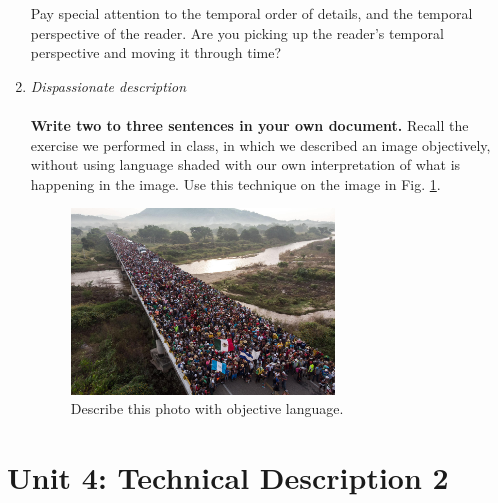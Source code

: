 \documentclass{article}
\begin{document}
\begin{enumerate}
\begin{itemize}
\end{itemize}
Pay special attention to the temporal order of details, and the temporal perspective of the reader.  Are you picking up the reader's temporal perspective and moving it through time?
\item \textit{Dispassionate description} \\ \\
\textbf{Write two to three sentences in your own document.}  Recall the exercise we performed in class, in which we described an image objectively, without using language shaded with our own interpretation of what is happening in the image.  Use this technique on the image in Fig. \ref{fig:caravan}.

\begin{figure}
\centering
\includegraphics[width=7cm]{figures/caravan.jpg}
\caption{\label{fig:caravan} Describe this photo with objective language.}
\end{figure}
\end{enumerate}

\section{Unit 4: Technical Description 2}
\end{document}
